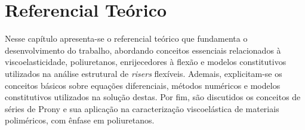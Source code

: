 \documentclass[arial,centeredequations,english,brazilian,oneside,section=TITLE]{ifes8}
\begin{document}

\chapter{Referencial Teórico}
\label{cha:referencial-teorico}

Nesse capítulo apresenta-se o referencial teórico que fundamenta o desenvolvimento do trabalho, 
abordando conceitos essenciais relacionados à viscoelasticidade, poliuretanos, enrijecedores à 
flexão e modelos constitutivos utilizados na análise estrutural de \emph{risers} flexíveis.
Ademais, explicitam-se os conceitos básicos sobre equações diferenciais, métodos numéricos e 
modelos constitutivos utilizados na solução destas. Por fim, são discutidos os conceitos de 
séries de Prony e sua aplicação na caracterização viscoelástica de materiais poliméricos, 
com ênfase em poliuretanos.
\end{document}
